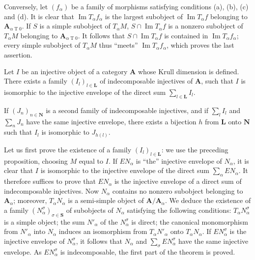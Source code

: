 Conversely, let $(f_\alpha)$ be a family of morphisms satisfying
conditions (a), (b), (c) and (d). It is clear that
$\operatorname{Im} T_\alpha f_\alpha$ is the largest subobject of
$\operatorname{Im} T_\alpha f$ belonging to
$\mathbf{A}_{\alpha \mathbin{T} 0}$. If $S$ is a simple subobject of
$T_\alpha M$, $S \cap \operatorname{Im} T_\alpha f$ is a nonzero
subobject of $T_\alpha M$ belonging to
$\mathbf{A}_{\alpha \mathbin{T} 0}$. It follows that
$S \cap \operatorname{Im} T_\alpha f$ is contained in
$\operatorname{Im} T_\alpha f_\alpha$; every simple subobject of
$T_\alpha M$ thus ``meets'' $\operatorname{Im} T_\alpha f_\alpha$,
which proves the last assertion.

\begin{theorem}
Let $I$ be an injective object of a category $\mathbf{A}$ whose Krull
dimension is defined. There exists a family
$(I_l)_{l\in\mathbf{L}}$ of indecomposable injectives of
$\mathbf{A}$, such that $I$ is isomorphic to the injective envelope of
the direct sum $\sum_{l\in\mathbf{L}} I_l$.

If $(J_n)_{n\in\mathbf{N}}$ is a second family of indecomposable
injectives, and if $\sum_l I_l$ and $\sum_n J_n$ have the same
injective envelope, there exists a bijection $h$ from $\mathbf{L}$
onto $\mathbf{N}$ such that $I_l$ is isomorphic to $J_{h(l)}$.
\end{theorem}

Let us first prove the existence of a family
$(I_l)_{l\in\mathbf{L}}$: we use the preceding proposition, choosing
$M$ equal to $I$. If $EN_\alpha$ is ``the'' injective envelope of
$N_\alpha$, it is clear that $I$ is isomorphic to the injective
envelope of the direct sum $\sum_\alpha EN_\alpha$. It therefore
suffices to prove that $EN_\alpha$ is the injective envelope of a
direct sum of indecomposable injectives. Now $N_\alpha$ contains no
nonzero subobject belonging to $\mathbf{A}_\alpha$; moreover,
$T_\alpha N_\alpha$ is a semi-simple object of
$\mathbf{A}/\mathbf{A}_\alpha$. We deduce the existence of a family
$(N_\alpha^\sigma)_{\sigma\in\mathbf{S}}$ of subobjects of $N_\alpha$
satisfying the following conditions: $T_\alpha N_\alpha^\sigma$ is a
simple object; the sum $N'_\alpha$ of the $N_\alpha^\sigma$ is
direct; the canonical monomorphism from $N'_\alpha$ into $N_\alpha$
induces an isomorphism from $T_\alpha N'_\alpha$ onto
$T_\alpha N_\alpha$. If $EN_\alpha^\sigma$ is the injective envelope
of $N_\alpha^\sigma$, it follows that $N_\alpha$ and
$\sum_\sigma EN_\alpha^\sigma$ have the same injective envelope. As
$EN_\alpha^\sigma$ is indecomposable, the first part of the theorem
is proved.

